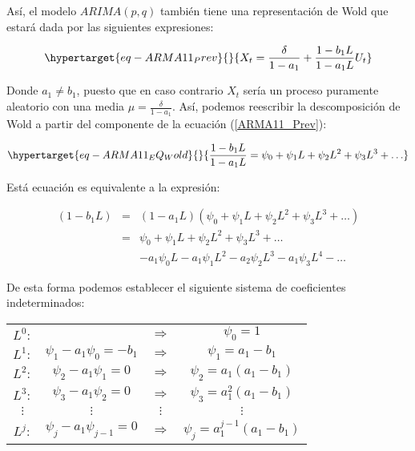 \documentclass[
  a4paper,
]{article}
\begin{document}
Así, el modelo \(ARIMA (p, q)\) también tiene una representación de Wold
que estará dada por las siguientes expresiones:

\begin{equation}\protect\hypertarget{eq-ARMA11_Prev}{}{
X_t = \frac{\delta}{1 - a_1} + \frac{1 - b_1 L}{1 - a_1 L} U_t
}\label{eq-ARMA11_Prev}\end{equation}

Donde \(a_1 \neq b_1\), puesto que en caso contrario \(X_t\) sería un
proceso puramente aleatorio con una media
\(\mu = \frac{\delta}{1 - a_1}\). Así, podemos reescribir la
descomposición de Wold a partir del componente de la ecuación
(\ref{ARMA11_Prev}):

\begin{equation}\protect\hypertarget{eq-ARMA11_EQ_Wold}{}{
\frac{1 - b_1 L}{1 - a_1 L} = \psi_0 + \psi_1 L + \psi_2 L^2 + \psi_3 L^3 + \ldots 
}\label{eq-ARMA11_EQ_Wold}\end{equation}

Está ecuación es equivalente a la expresión:

\begin{eqnarray}
    (1 - b_1 L) & = & (1 - a_1 L)(\psi_0 + \psi_1 L + \psi_2 L^2 + \psi_3 L^3 + \ldots) \nonumber \\
    & = & \psi_0 + \psi_1 L + \psi_2 L^2 + \psi_3 L^3 + \ldots \nonumber \\
    &   & - a_1 \psi_0 L - a_1 \psi_1 L^2 - a_2 \psi_2 L^3 - a_1 \psi_3 L^4 - \ldots \nonumber
\end{eqnarray}

De esta forma podemos establecer el siguiente sistema de coeficientes
indeterminados:

\begin{center}
\begin{tabular}{ c c c c } 
    $L^0 :$ & $ $ & $\Rightarrow$ & $\psi_0 = 1$ \\
    $L^1 :$ & $\psi_1 - a_1 \psi_0 = - b_1$ & $\Rightarrow$ & $\psi_1 = a_1 - b_1$ \\
    $L^2 :$ & $\psi_2 - a_1 \psi_1 = 0$ & $\Rightarrow$ & $\psi_2 = a_1(a_1 - b_1)$ \\
    $L^3 :$ & $\psi_3 - a_1 \psi_2 = 0$ & $\Rightarrow$ & $\psi_3 = a^2_1(a_1 - b_1)$ \\
    $\vdots$ & $\vdots$ & $\vdots$ & $\vdots$ \\
    $L^j :$ & $\psi_j - a_1 \psi_{j - 1} = 0$ & $\Rightarrow$ & $\psi_j = a^{j - 1}_1(a_1 - b_1)$
\end{tabular}
\end{center}
\end{document}
